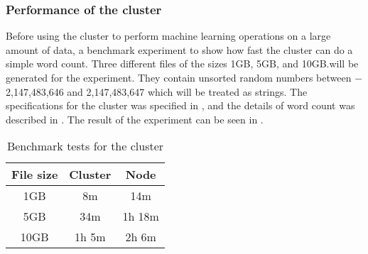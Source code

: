 \subsubsection{Performance of the cluster}\label{sec:benchmark}
Before using the cluster to perform machine learning operations on a large amount of data, a benchmark experiment to show how fast the cluster can do a simple word count. Three different files of the sizes 1GB, 5GB, and 10GB.\@ will be generated for the experiment. They contain unsorted random numbers between $-$2,147,483,646 and 2,147,483,647 which will be treated as strings. The specifications for the cluster was specified in , and the details of word count was described in . The result of the experiment can be seen in . 
\begin{table}[!htb]
  \centering
  \begin{tabular}{|c|c c|}
    \hline
    File size & Cluster & Node \\
    \hline
    1GB & 8m & 14m\\ %
    5GB & 34m & 1h 18m \\ %
    10GB & 1h 5m & 2h 6m \\ %
    \hline
  \end{tabular}
  \caption{Benchmark tests for the cluster}
  \label{tab:bench}
\end{table}
